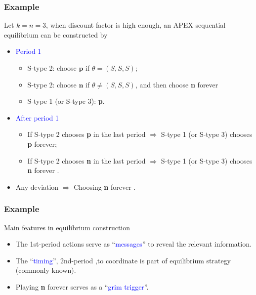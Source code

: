 \documentclass[8pt]{beamer}
\begin{document}
\begin{frame}
  \frametitle{Example}
\begin{center}
\end{center}

  
Let \alert{$k=n=3$}, when discount factor is high enough, an APEX sequential equilibrium can be constructed by
\begin{itemize}

\item \textcolor{blue}{Period 1}
\begin{itemize}
\item S-type 2: choose $\textbf{p}$ if $\theta=(S,S,S)$;
\item S-type 2: choose $\textbf{n}$ if $\theta\neq (S,S,S)$, and then choose \alert<2>{\textbf{n} forever }
\item S-type 1 (or S-type 3): \textbf{p}.
\end{itemize}

\item \textcolor{blue}{After period 1}
\begin{itemize}
\item If S-type 2 chooses \textbf{p} in the last period $\Rightarrow$ S-type 1 (or S-type 3) chooses \textbf{p} forever; 
\item If S-type 2 chooses \textbf{n} in the last period $\Rightarrow$ S-type 1 (or S-type 3) chooses \alert<2>{\textbf{n} forever }.
\end{itemize}
 
 \item Any deviation $\Rightarrow$ Choosing \alert<2>{\textbf{n} forever }.
\end{itemize}

\end{frame}


\begin{frame}
  \frametitle{Example}
Main features in equilibrium construction
\begin{itemize}
\item The \alert{1st-period} actions serve as ``\textcolor{blue}{messages}'' to reveal the relevant information.
\item The ``\textcolor{blue}{timing}'', \alert{2nd-period} ,to coordinate is part of equilibrium strategy (commonly known).  
\item \alert{Playing \textbf{n} forever} serves as a ``\textcolor{blue}{grim trigger}''.
\end{itemize}  
\end{frame}
\end{document}
